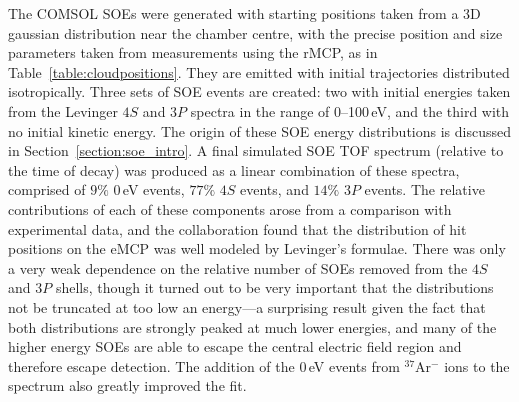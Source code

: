 The COMSOL SOEs were generated with starting positions taken from a 3D gaussian distribution near the chamber centre, with the precise position and size parameters taken from measurements using the rMCP, as in Table~\ref{table:cloudpositions}.  They are emitted with initial trajectories distributed isotropically.  Three sets of SOE events are created: two with initial energies taken from the Levinger $4S$ and $3P$ spectra in the range of 0--100\,eV, and the third with no initial kinetic energy.  The origin of these SOE energy distributions is discussed in Section~\ref{section:soe_intro}.
A final simulated SOE TOF spectrum (relative to the time of decay) was produced as a linear combination of these spectra, comprised of $9\%$ 0\,eV events, $77\%$ $4S$ events, and $14\%$ $3P$ events.  The relative contributions of each of these components arose from a comparison with experimental data, and the collaboration found that the distribution of hit positions on the eMCP was well modeled by Levinger's formulae. There was only a very weak dependence on the relative number of SOEs removed from the $4S$ and $3P$ shells, though it turned out to be very important that the distributions not be truncated at too low an energy---a surprising result given the fact that both distributions are strongly peaked at much lower energies, and many of the higher energy SOEs are able to escape the central electric field region and therefore escape detection.     The addition of the 0\,eV events from $^{37}$Ar$^{-}$ ions to the spectrum also greatly improved the fit.



